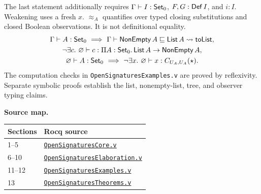 The last statement additionally requires
$\Gamma\vdash I:\mathsf{Set}_0$, $F,G:\mathsf{Def}\,I$, and $i:I$.
Weakening uses a fresh $x$.
$\approx_A$ quantifies over typed closing substitutions and closed Boolean
observations. It is not definitional equality.
\[
\begin{gathered}
 \Gamma\vdash A:\mathsf{Set}_0
 \ \Longrightarrow\
 \Gamma\vdash \mathsf{NonEmpty}\,A\sqsubseteq \mathsf{List}\,A\rightsquigarrow \mathsf{toList},\\
 \neg\exists c.\ \varnothing\vdash c:
       \Pi A:\mathsf{Set}_0.\,\mathsf{List}\,A\to\mathsf{NonEmpty}\,A,\\
 \varnothing\vdash A:\mathsf{Set}_0
 \ \Longrightarrow\
 \neg\exists x.\ \varnothing\vdash x:C_{U_A,U_A}(\star).
\end{gathered}
\]
The computation checks in \texttt{OpenSignaturesExamples.v} are
proved by reflexivity. Separate symbolic proofs establish the list,
nonempty-list, tree, and observer typing claims.

\textbf{Source map.}
\begin{center}
\begin{tabular}{@{}ll@{}}
\toprule
Sections & Rocq source\\
\midrule
1--5 & \href{../../progress/OpenSignaturesCore.v}{\texttt{OpenSignaturesCore.v}}\\
6--10 & \href{../../progress/OpenSignaturesElaboration.v}{\texttt{OpenSignaturesElaboration.v}}\\
11--12 & \href{../../progress/OpenSignaturesExamples.v}{\texttt{OpenSignaturesExamples.v}}\\
13 & \href{../../progress/OpenSignaturesTheorems.v}{\texttt{OpenSignaturesTheorems.v}}\\
\bottomrule
\end{tabular}
\end{center}
